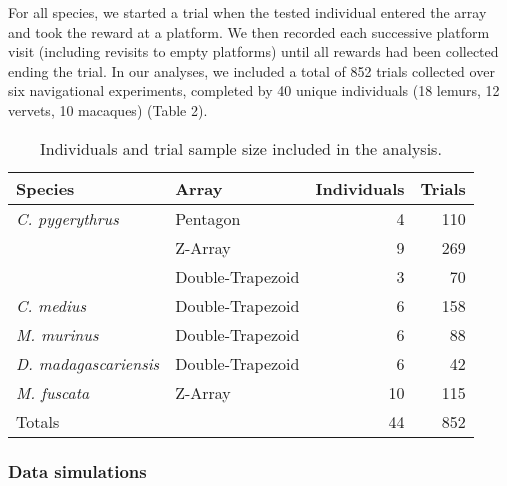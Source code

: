 \documentclass[twoside,12pt,final]{ucthesis-CA2012}
\begin{document}
\begin{ucmainmatter}
For all species, we started a trial when the tested individual entered the array and took the reward at a platform. We then recorded each successive platform visit (including revisits to empty platforms) until all rewards had been collected ending the trial. In our analyses, we included a total of 852 trials collected over six navigational experiments, completed by 40 unique individuals (18 lemurs, 12 vervets, 10 macaques) (Table 2).
\begin{table}

\caption{\label{tab:sample-size-Table}Individuals and trial sample size included in the analysis.}
\centering
\begin{tabular}[t]{l|l|r|r}
\hline
Species & Array & Individuals & Trials\\
\hline
\textit{C. pygerythrus} & Pentagon & 4 & 110\\
\hline
 & Z-Array & 9 & 269\\
\hline
 & Double-Trapezoid & 3 & 70\\
\hline
\textit{C. medius} & Double-Trapezoid & 6 & 158\\
\hline
\textit{M. murinus} & Double-Trapezoid & 6 & 88\\
\hline
\textit{D. madagascariensis} & Double-Trapezoid & 6 & 42\\
\hline
\textit{M. fuscata} & Z-Array & 10 & 115\\
\hline
Totals &  & 44 & 852\\
\hline
\end{tabular}
\end{table}
\hypertarget{data-simulations}{%
\subsubsection{Data simulations}\label{data-simulations}}


\end{ucmainmatter}
\end{document}
